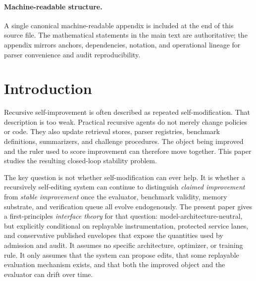 \documentclass[11pt]{article}
\theoremstyle{definition}
\newcommand{\1}{\mathbf{1}}
\begin{document}
\begin{abstract}
The framework is self-contained only as a first-principles \emph{interface layer} conditional on published replayable instrumentation and conservative envelope objects: it does not assume a privileged overseer, a fixed benchmark, or any particular model architecture or training rule, but it does assume replayable interfaces through which governance-relevant quantities are exposed. It is therefore not infrastructure-free. Replayable interfaces, protected service lanes, proof checkers, attestation roots, contradiction-obligation logs, published transport and calibration envelopes, and resource escrows are part of the modeled object rather than implementation garnish. The resulting stance is growth-promoting only on explicit observable sufficient-condition classes and explicit regime-policy pairs, and the strongest realized-path claims are comparison-contract corollaries built on the operator-monotonicity layer rather than unconditional laws of recursive improvement. When those interfaces fail, the failure mode is not mysterious: the loop loses identifiability, loses audit mass, loses deployment liveness, loses protected budget, or loses throughput before it loses rhetoric.
\end{abstract}

\paragraph{Machine-readable structure.}
A single canonical machine-readable appendix is included at the end of this source file. The mathematical statements in the main text are authoritative; the appendix mirrors anchors, dependencies, notation, and operational lineage for parser convenience and audit reproducibility.

\section{Introduction}
Recursive self-improvement is often described as repeated self-modification. That description is too weak. Practical recursive agents do not merely change policies or code. They also update retrieval stores, parser registries, benchmark definitions, summarizers, and challenge procedures. The object being improved and the ruler used to score improvement can therefore move together. This paper studies the resulting closed-loop stability problem.

The key question is not whether self-modification can ever help. It is whether a recursively self-editing system can continue to distinguish \emph{claimed improvement} from \emph{stable improvement} once the evaluator, benchmark validity, memory substrate, and verification queue all evolve endogenously. The present paper gives a first-principles \emph{interface theory} for that question: model-architecture-neutral, but explicitly conditional on replayable instrumentation, protected service lanes, and conservative published envelopes that expose the quantities used by admission and audit. It assumes no specific architecture, optimizer, or training rule. It only assumes that the system can propose edits, that some replayable evaluation mechanism exists, and that both the improved object and the evaluator can drift over time.
\end{document}

